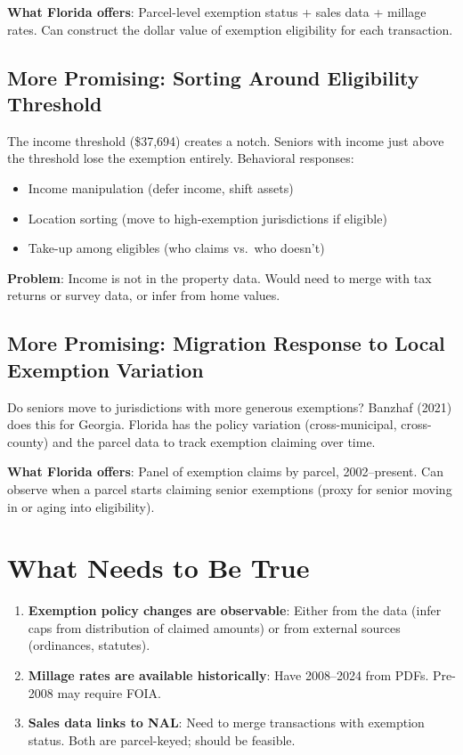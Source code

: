 \documentclass[11pt]{article}
\begin{document}
\textbf{What Florida offers}: Parcel-level exemption status + sales data + millage rates. Can construct the dollar value of exemption eligibility for each transaction.

\subsection{More Promising: Sorting Around Eligibility Threshold}

The income threshold (\$37,694) creates a notch. Seniors with income just above the threshold lose the exemption entirely. Behavioral responses:
\begin{itemize}
    \item Income manipulation (defer income, shift assets)
    \item Location sorting (move to high-exemption jurisdictions if eligible)
    \item Take-up among eligibles (who claims vs.\ who doesn't)
\end{itemize}

\textbf{Problem}: Income is not in the property data. Would need to merge with tax returns or survey data, or infer from home values.

\subsection{More Promising: Migration Response to Local Exemption Variation}

Do seniors move to jurisdictions with more generous exemptions? Banzhaf (2021) does this for Georgia. Florida has the policy variation (cross-municipal, cross-county) and the parcel data to track exemption claiming over time.

\textbf{What Florida offers}: Panel of exemption claims by parcel, 2002--present. Can observe when a parcel starts claiming senior exemptions (proxy for senior moving in or aging into eligibility).

\section{What Needs to Be True}

\begin{enumerate}
    \item \textbf{Exemption policy changes are observable}: Either from the data (infer caps from distribution of claimed amounts) or from external sources (ordinances, statutes).

    \item \textbf{Millage rates are available historically}: Have 2008--2024 from PDFs. Pre-2008 may require FOIA.

    \item \textbf{Sales data links to NAL}: Need to merge transactions with exemption status. Both are parcel-keyed; should be feasible.
\end{enumerate}
\end{document}
